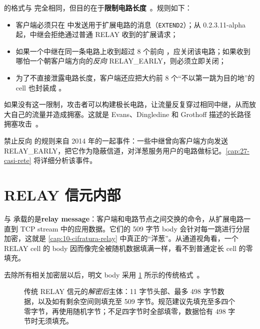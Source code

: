  的格式与  完全相同，但目的在于\textbf{限制电路长度}~。规则如下：
\begin{itemize}
  \item 客户端必须只在  中发送用于扩展电路的消息（\texttt{EXTEND2}）；从 0.2.3.11-alpha 起，中继会拒绝通过普通 RELAY 收到的扩展请求；
  \item 如果一个中继在同一条电路上收到超过 8 个前向 ，应关闭该电路；如果收到哪怕一个朝客户端方向的\emph{反向} RELAY\_EARLY，则必须立即关闭；
  \item 为了不直接泄露电路长度，客户端还应把大约前 8 个“不以第一跳为目的地”的 cell 也封装成 。
\end{itemize}

如果没有这一限制，攻击者可以构建极长电路，让流量反复穿过相同中继，从而放大自己的流量并造成拥塞。这就是 Evans、Dingledine 和 Grothoff 描述的长路径拥塞攻击~\cite{evans2009congestion}。

\begin{storia}[一个意外的信号]
禁止反向  的规则来自 2014 年的一起事件：一些中继曾向客户端方向发送 RELAY\_EARLY，把它作为隐蔽信道，对洋葱服务用户的电路做标记。\cref{cap:27-casi-rete} 将详细分析该事件。
\end{storia}

\section{RELAY 信元内部}\label{sec:relay}

 与  承载的是\textbf{relay message}：客户端和电路节点之间交换的命令，从扩展电路一直到 TCP stream 中的应用数据。它们的 509 字节 body 会针对每一跳进行分层加密，这就是 \cref{cap:10-cifratura-relay} 中真正的“洋葱”。从通道视角看，一个 RELAY cell 的 body 因而像完全被随机数据填满一样，看不到普通定长 cell 的零填充。

去除所有相关加密层以后，明文 body 采用 \cref{fig:relay} 所示的传统格式~。

\begin{figure}[htbp]
\centering

\caption{传统 RELAY 信元的\emph{解密后}主体：11 字节头部、最多 498 字节数据，以及如有剩余空间则填充至 509 字节。规范建议先填充至多四个零字节，再使用随机字节；不足四字节时全部填零，数据恰有 498 字节时无须填充。}
\label{fig:relay}
\end{figure}

